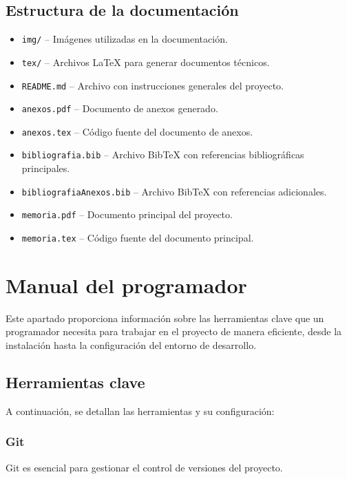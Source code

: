 \subsection*{Estructura de la documentación}

\begin{itemize}
    \item \texttt{img/} -- Imágenes utilizadas en la documentación.
    \item \texttt{tex/} -- Archivos \LaTeX{} para generar documentos técnicos.
    \item \texttt{README.md} -- Archivo con instrucciones generales del proyecto.
    \item \texttt{anexos.pdf} -- Documento de anexos generado.
    \item \texttt{anexos.tex} -- Código fuente del documento de anexos.
    \item \texttt{bibliografia.bib} -- Archivo BibTeX con referencias bibliográficas principales.
    \item \texttt{bibliografiaAnexos.bib} -- Archivo BibTeX con referencias adicionales.
    \item \texttt{memoria.pdf} -- Documento principal del proyecto.
    \item \texttt{memoria.tex} -- Código fuente del documento principal.
\end{itemize}


\section{Manual del programador}

Este apartado proporciona información sobre las herramientas clave que un programador necesita para trabajar en el proyecto de manera eficiente, desde la instalación hasta la configuración del entorno de desarrollo.

\subsection{Herramientas clave}

A continuación, se detallan las herramientas y su configuración:

\subsubsection{Git}
Git es esencial para gestionar el control de versiones del proyecto.

